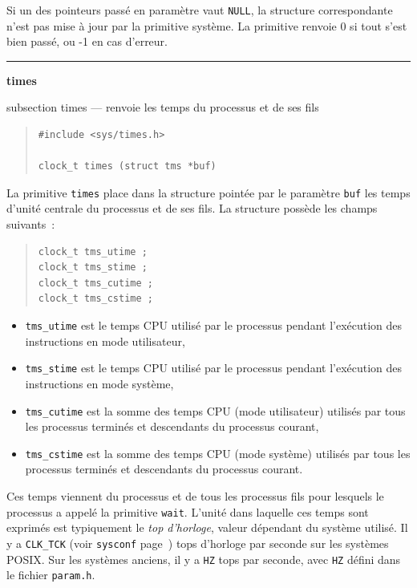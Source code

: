 \documentclass [twoside] {report}
\newcommand {\primitive} [1]
    {
	\phantomsection
	{\large \textbf {#1}}
	\addcontentsline {toc} {subsection} {#1}
    }
\newcommand {\separation}
    {
	\vspace {5mm}
	\nopagebreak
	\hrule
    }
\begin{document}
Si un des pointeurs passé en paramètre vaut \texttt {NULL}, la structure
correspondante n'est pas mise à jour par la primitive système. La
primitive renvoie 0 si tout s'est bien passé, ou -1 en cas d'erreur.


\separation
\primitive {times} --- renvoie les temps du processus et de ses fils

\begin {quote}
\begin {verbatim}
#include <sys/times.h>

clock_t times (struct tms *buf)
\end{verbatim}
\end {quote}

La primitive \texttt {times} place dans la structure pointée par le
paramètre \texttt {buf} les temps d'unité centrale du processus et de
ses fils. La structure possède les champs suivants~:

\begin {quote}
\begin {verbatim}
clock_t tms_utime ;
clock_t tms_stime ;
clock_t tms_cutime ;
clock_t tms_cstime ;
\end{verbatim}
\end {quote}

\begin {itemize}
    \item \texttt {tms\_utime} est le temps CPU utilisé par le processus
	pendant l'exécution des instructions en mode utilisateur,

    \item \texttt {tms\_stime} est le temps CPU utilisé par le processus
	pendant l'exécution des instructions en mode système,

    \item \texttt {tms\_cutime} est la somme des temps CPU (mode
	utilisateur) utilisés par tous les processus terminés et
	descendants du processus courant,

    \item \texttt {tms\_cstime} est la somme des temps CPU (mode système)
	utilisés par tous les processus terminés et descendants du
	processus courant.
\end {itemize}

Ces temps viennent du processus et de tous les processus fils pour
lesquels le processus a appelé la primitive \texttt {wait}. L'unité dans
laquelle ces temps sont exprimés est typiquement le \emph {top d'horloge},
valeur dépendant du système utilisé.
Il y a \texttt {CLK\_TCK} (voir \texttt {sysconf} page~\pageref {sysconf}) tops
d'horloge par seconde sur les systèmes POSIX. Sur les systèmes anciens,
il y a \texttt {HZ} tops par seconde, avec \texttt {HZ} défini dans le fichier
\texttt {param.h}.
\end{document}
